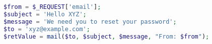 \begin{lstlisting}[language=PHP,caption={PHP program with e-mail
      header injection vulnerability.},label={code:phpemi}, float]
$from = $_REQUEST['email'];
$subject = 'Hello XYZ';
$message = 'We need you to reset your password';
$to = 'xyz@example.com';
$retValue = mail($to, $subject, $message, "From: $from");
\end{lstlisting}

